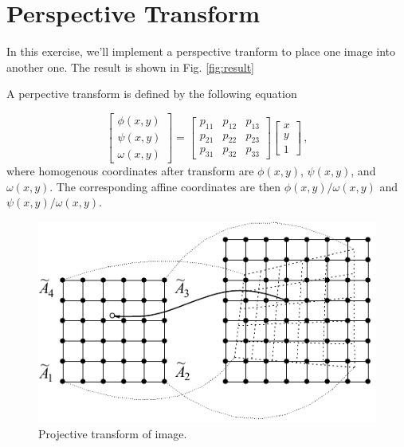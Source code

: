 \documentclass[12pt]{article}
\begin{document}
\section*{Perspective Transform}

In this exercise, we'll implement a perspective tranform to place one image into another one.
The result is shown in Fig. \ref{fig:result}

A perpective transform is defined by the following equation

\begin{equation}
    \label{eq:proj}
    \begin{bmatrix}
        \phi(x, y) \\
        \psi(x, y) \\
        \omega(x, y)
    \end{bmatrix}
    =
    \begin{bmatrix}
        p_{11} & p_{12} & p_{13} \\
        p_{21} & p_{22} & p_{23} \\
        p_{31} & p_{32} & p_{33}
    \end{bmatrix}
    \begin{bmatrix}
        x \\
        y \\
        1
    \end{bmatrix}
    \, ,
\end{equation}
where homogenous coordinates after transform are $\phi(x, y)$, $\psi(x, y)$, and $\omega(x, y)$.
The corresponding affine coordinates are then $\phi(x, y) / \omega(x, y)$ and $\psi(x, y) / \omega(x, y)$.

\begin{figure}[th]
    \begin{center}
        \includegraphics[scale=1.0]{img_6_7}
    \end{center}
    \caption{Projective transform of image.}
    \label{img:6_7}
\end{figure}
\end{document}
